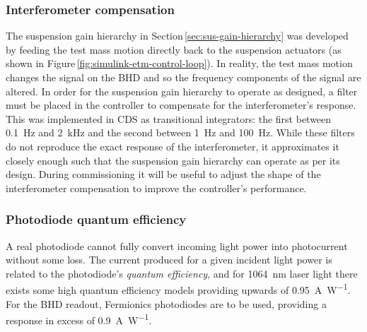 \subsubsection{\label{sec:ifo-compensation}Interferometer compensation}
The suspension gain hierarchy in Section\,\ref{sec:sus-gain-hierarchy} was developed by feeding the test mass motion directly back to the suspension actuators (as shown in Figure\,\ref{fig:simulink-etm-control-loop}). In reality, the test mass motion changes the signal on the \gls{BHD} and so the frequency components of the signal are altered. In order for the suspension gain hierarchy to operate as designed, a filter must be placed in the controller to compensate for the interferometer's response. This was implemented in \gls{CDS} as transitional integrators: the first between \SI{0.1}{\hertz} and \SI{2}{\kilo\hertz} and the second between \SI{1}{\hertz} and \SI{100}{\hertz}. While these filters do not reproduce the exact response of the interferometer, it approximates it closely enough such that the suspension gain hierarchy can operate as per its design. During commissioning it will be useful to adjust the shape of the interferometer compensation to improve the controller's performance.

\subsubsection{Photodiode quantum efficiency}
A real photodiode cannot fully convert incoming light power into photocurrent without some loss. The current produced for a given incident light power is related to the photodiode's \emph{quantum efficiency}, and for \SI{1064}{\nano\meter} laser light there exists some high quantum efficiency models providing upwards of \SI{0.95}{\ampere\per\watt}. For the \gls{BHD} readout, Fermionics photodiodes are to be used, providing a response in excess of \SI{0.9}{\ampere\per\watt}.

